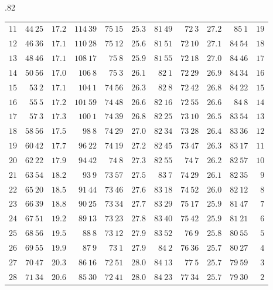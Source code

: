 \begin{GaussVICeresFrame}{.82}
{\begin{tabular}{r@{\GaussVICeresRule}r|r|r@{\GaussVICeresRule}r|r|r@{\GaussVICeresRule}r|r|r@{\GaussVICeresRule}r}
$11$ & $44\ 25$ & $17.2$ & $114\ 39$ & $75\ 15$ & $25.3$ & $81\ 49$ & $72\ 3$ & $27.2$ & $85\ 1$ & $19$ \\
$12$ & $46\ 36$ & $17.1$ & $110\ 28$ & $75\ 12$ & $25.6$ & $81\ 51$ & $72\ 10$ & $27.1$ & $84\ 54$ & $18$ \\
$13$ & $48\ 46$ & $17.1$ & $108\ 17$ & $75\ 8$ & $25.9$ & $81\ 55$ & $72\ 18$ & $27.0$ & $84\ 46$ & $17$ \\
$14$ & $50\ 56$ & $17.0$ & $106\ 8$ & $75\ 3$ & $26.1$ & $82\ 1$ & $72\ 29$ & $26.9$ & $84\ 34$ & $16$ \\
$15$ & $53\ 2$ & $17.1$ & $104\ 1$ & $74\ 56$ & $26.3$ & $82\ 8$ & $72\ 42$ & $26.8$ & $84\ 22$ & $15$ \\[3pt]
$16$ & $55\ 5$ & $17.2$ & $101\ 59$ & $74\ 48$ & $26.6$ & $82\ 16$ & $72\ 55$ & $26.6$ & $84\ 8$ & $14$ \\
$17$ & $57\ 3$ & $17.3$ & $100\ 1$ & $74\ 39$ & $26.8$ & $82\ 25$ & $73\ 10$ & $26.5$ & $83\ 54$ & $13$ \\
$18$ & $58\ 56$ & $17.5$ & $98\ 8$ & $74\ 29$ & $27.0$ & $82\ 34$ & $73\ 28$ & $26.4$ & $83\ 36$ & $12$ \\
$19$ & $60\ 42$ & $17.7$ & $96\ 22$ & $74\ 19$ & $27.2$ & $82\ 45$ & $73\ 47$ & $26.3$ & $83\ 17$ & $11$ \\
$20$ & $62\ 22$ & $17.9$ & $94\ 42$ & $74\ 8$ & $27.3$ & $82\ 55$ & $74\ 7$ & $26.2$ & $82\ 57$ & $10$ \\[3pt]
$21$ & $63\ 54$ & $18.2$ & $93\ 9$ & $73\ 57$ & $27.5$ & $83\ 7$ & $74\ 29$ & $26.1$ & $82\ 35$ & $9$ \\
$22$ & $65\ 20$ & $18.5$ & $91\ 44$ & $73\ 46$ & $27.6$ & $83\ 18$ & $74\ 52$ & $26.0$ & $82\ 12$ & $8$ \\
$23$ & $66\ 39$ & $18.8$ & $90\ 25$ & $73\ 34$ & $27.7$ & $83\ 29$ & $75\ 17$ & $25.9$ & $81\ 47$ & $7$ \\
$24$ & $67\ 51$ & $19.2$ & $89\ 13$ & $73\ 23$ & $27.8$ & $83\ 40$ & $75\ 42$ & $25.9$ & $81\ 21$ & $6$ \\
$25$ & $68\ 56$ & $19.5$ & $88\ 8$ & $73\ 12$ & $27.9$ & $83\ 52$ & $76\ 9$ & $25.8$ & $80\ 55$ & $5$ \\[3pt]
$26$ & $69\ 55$ & $19.9$ & $87\ 9$ & $73\ 1$ & $27.9$ & $84\ 2$ & $76\ 36$ & $25.7$ & $80\ 27$ & $4$ \\
$27$ & $70\ 47$ & $20.3$ & $86\ 16$ & $72\ 51$ & $28.0$ & $84\ 13$ & $77\ 5$ & $25.7$ & $79\ 59$ & $3$ \\
$28$ & $71\ 34$ & $20.6$ & $85\ 30$ & $72\ 41$ & $28.0$ & $84\ 23$ & $77\ 34$ & $25.7$ & $79\ 30$ & $2$ \\

\end{tabular}}
\end{GaussVICeresFrame}
